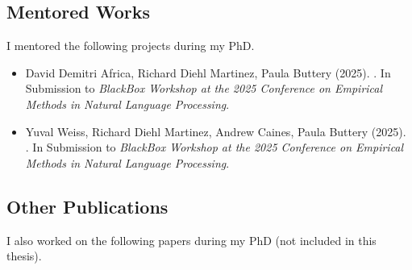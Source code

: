 \newpage

\begin{tcolorbox}[
    enhanced,
    colback=white,
    colframe=thesisblue,
    arc=0mm,
    boxrule=1pt,
    left=10pt,
    right=10pt,
    top=10pt,
    bottom=10pt,
    title=Additional Works,
    fonttitle=\bfseries,
    coltitle=white
]
\subsection*{Mentored Works}
I mentored the following projects during my PhD.

\begin{itemize}
    \item David Demitri Africa, Richard Diehl Martinez, Paula Buttery (2025). {\color{thesisblue}{Examining the Performance Gap: Meta-Learning for Pretraining Small Language Models}}. In Submission to \emph{BlackBox Workshop at the 2025 Conference on Empirical Methods in Natural Language Processing}.
    \item Yuval Weiss, Richard Diehl Martinez, Andrew Caines, Paula Buttery (2025). {\color{thesisblue}{Investigating ReLoRA: Effects on the Learning Dynamics of Small Language Models}}. In Submission to \emph{BlackBox Workshop at the 2025 Conference on Empirical Methods in Natural Language Processing}.
\end{itemize}

\subsection*{Other Publications}
I also worked on the following papers during my PhD (not included in this thesis).


\end{tcolorbox}
